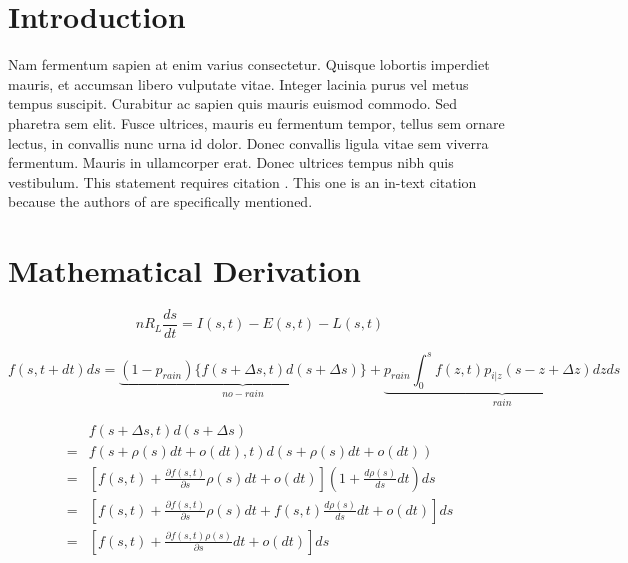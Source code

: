 \documentclass[draft,wrr]{AGUTeX}
\begin{document}
\begin{article}

\section{Introduction}

Nam fermentum sapien at enim varius consectetur. Quisque lobortis imperdiet mauris, et accumsan libero vulputate vitae. Integer lacinia purus vel metus tempus suscipit. Curabitur ac sapien quis mauris euismod commodo. Sed pharetra sem elit. Fusce ultrices, mauris eu fermentum tempor, tellus sem ornare lectus, in convallis nunc urna id dolor. Donec convallis ligula vitae sem viverra fermentum. Mauris in ullamcorper erat. Donec ultrices tempus nibh quis vestibulum. This statement requires citation \citep{AtkinsonSloan}. This one is an in-text citation because the authors of \citet{ColtonKress1} are specifically mentioned.

 


\section{Mathematical Derivation} 
 
\begin{equation}
\label{sbalance}
nR_{L}\frac{ds}{dt}=I(s,t)-E(s,t)-L(s,t)
\end{equation}


\begin{equation}
\label{basic1}
f(s,t+dt)ds= \underbrace{(1-p_{rain})\Bigg \{ f(s+\Delta s,t)d(s+\Delta s) \Bigg \} }_{no-rain} +\underbrace{p_{rain} \int_{0}^{s} f(z,t)p_{i|z}(s-z+\Delta z)dzds}_{rain}
\end{equation}

 
\begin{equation}
\label{norain1}
\begin{split}
&f(s+\Delta s,t)d(s+\Delta s)\\=&f(s+\rho(s)dt+o(dt),t)d(s+\rho(s)dt+o(dt))
\\=&[f(s,t)+\frac{\partial{f(s,t)}}{\partial s}\rho(s)dt+o(dt)](1+\frac{d\rho(s)}{ds}dt)ds
\\=&[f(s,t)+\frac{\partial{f(s,t)}}{\partial s}\rho(s)dt+f(s,t)\frac{d\rho(s)}{ds}dt+o(dt)]ds
\\=&[f(s,t)+\frac{\partial{f(s,t)\rho(s)}}{\partial s}dt+o(dt)]ds
\end{split}
\end{equation}


\end{article}
\end{document}
